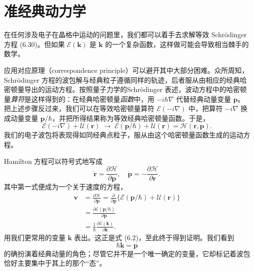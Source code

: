 \section{准经典动力学}

在任何涉及电子在晶格中运动的问题里，我们都可以着手去求解等效 Schrödinger 方程 (6.30)。但如果 $\mathcal{E}(\mathbf{k})$ 是 $\mathbf{k}$ 的一个复杂函数，这样做可能会导致相当棘手的数学。

应用对应原理（correspondence principle）可以避开其中大部分困难。众所周知，Schrödinger 方程的波包解与经典粒子遵循同样的轨迹，后者服从由相应的经典哈密顿量导出的运动方程。按照量子力学的Schrödinger 表述，波动方程中的哈密顿量\emph{算符}是这样得到的：在经典哈密顿量\emph{函数}中，用 $-i\hbar\nabla$ 代替经典动量变量 $\mathbf{p}$。把上述步骤反过来，我们可以在等效哈密顿量算符 $\mathcal{E}(-i\nabla)$ 中，把算符 $-i\nabla$ 换成动量变量 $\mathbf{p}/\hbar$，并把所得结果称为等效经典哈密顿量函数。于是，
\begin{equation*}
\mathcal{E}(-i\nabla)+\mathcal{U}(\mathbf{r})\;\rightarrow\;\mathcal{E}(\mathbf{p}/\hbar)+\mathcal{U}(\mathbf{r})=\mathcal{H}(\mathbf{r},\mathbf{p}). \tag{6.34}
\end{equation*}
我们的电子波包将表现得如同经典点粒子，服从由这个哈密顿量函数生成的运动方程。

Hamilton 方程可以符号式地写成
\begin{equation*}
\dot{\mathbf{r}}=\frac{\partial\mathcal{H}}{\partial\mathbf{p}},\quad \dot{\mathbf{p}}=-\frac{\partial\mathcal{H}}{\partial\mathbf{r}}. \tag{6.35}
\end{equation*}
其中第一式便成为一个关于速度的方程，
\begin{align*}
\mathbf{v}&=\frac{\partial\mathcal{H}}{\partial\mathbf{p}}=\frac{\partial}{\partial\mathbf{p}}\bigl\{\mathcal{E}(\mathbf{p}/\hbar)+\mathcal{U}(\mathbf{r})\bigr\}\\
&=\frac{\partial\mathcal{E}(\mathbf{p}/\hbar)}{\partial\mathbf{p}}\\
&=\frac{1}{\hbar}\frac{\partial\mathcal{E}(\mathbf{k})}{\partial\mathbf{k}}. \tag{6.36}
\end{align*}
用我们更常用的变量 $\mathbf{k}$ 表出。这正是式 (6.2)，至此终于得到证明。我们看到
\begin{equation*}
\hbar\mathbf{k}=\mathbf{p} \tag{6.37}
\end{equation*}
的确扮演着经典动量的角色；尽管它并不是一个唯一确定的变量，它却标记着波包恰好主要集中于其上的那个“态”。

